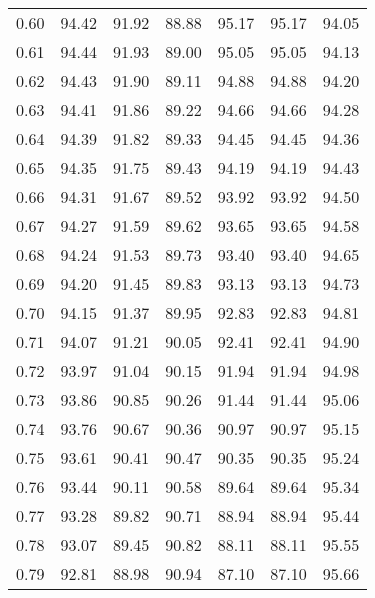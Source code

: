 \begin{tabular}{|c|c|c|c|c|c|c|}
      0.60 &     94.42 &     91.92 &      88.88 &   95.17 &      95.17 &         94.05 \\
      0.61 &     94.44 &     91.93 &      89.00 &   95.05 &      95.05 &         94.13 \\
      0.62 &     94.43 &     91.90 &      89.11 &   94.88 &      94.88 &         94.20 \\
      0.63 &     94.41 &     91.86 &      89.22 &   94.66 &      94.66 &         94.28 \\
      0.64 &     94.39 &     91.82 &      89.33 &   94.45 &      94.45 &         94.36 \\
      0.65 &     94.35 &     91.75 &      89.43 &   94.19 &      94.19 &         94.43 \\
      0.66 &     94.31 &     91.67 &      89.52 &   93.92 &      93.92 &         94.50 \\
      0.67 &     94.27 &     91.59 &      89.62 &   93.65 &      93.65 &         94.58 \\
      0.68 &     94.24 &     91.53 &      89.73 &   93.40 &      93.40 &         94.65 \\
      0.69 &     94.20 &     91.45 &      89.83 &   93.13 &      93.13 &         94.73 \\
      0.70 &     94.15 &     91.37 &      89.95 &   92.83 &      92.83 &         94.81 \\
      0.71 &     94.07 &     91.21 &      90.05 &   92.41 &      92.41 &         94.90 \\
      0.72 &     93.97 &     91.04 &      90.15 &   91.94 &      91.94 &         94.98 \\
      0.73 &     93.86 &     90.85 &      90.26 &   91.44 &      91.44 &         95.06 \\
      0.74 &     93.76 &     90.67 &      90.36 &   90.97 &      90.97 &         95.15 \\
      0.75 &     93.61 &     90.41 &      90.47 &   90.35 &      90.35 &         95.24 \\
      0.76 &     93.44 &     90.11 &      90.58 &   89.64 &      89.64 &         95.34 \\
      0.77 &     93.28 &     89.82 &      90.71 &   88.94 &      88.94 &         95.44 \\
      0.78 &     93.07 &     89.45 &      90.82 &   88.11 &      88.11 &         95.55 \\
      0.79 &     92.81 &     88.98 &      90.94 &   87.10 &      87.10 &         95.66 \\

\end{tabular}
